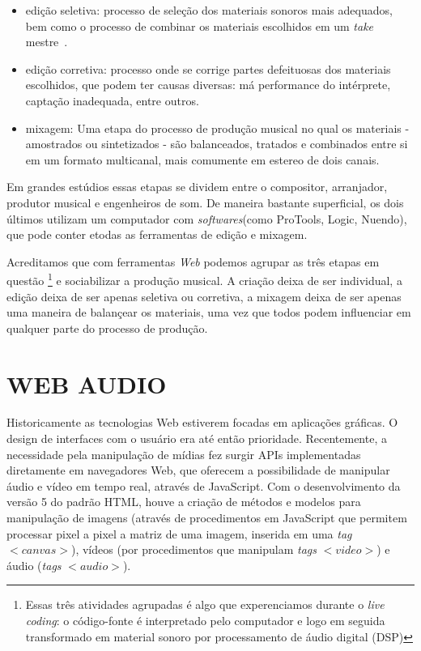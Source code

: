 \documentclass
  [ams,pdfout]%
        {aesbr}
\begin{document}
\begin{itemize}
    \item edição seletiva: processo de seleção dos materiais sonoros
      mais adequados, bem como o processo de combinar os materiais
      escolhidos em um \emph{take} mestre~\cite{izhaki2008mix}.
    \item edição corretiva: processo onde se corrige partes
      defeituosas dos materiais escolhidos, que podem ter causas
      diversas: má performance do intérprete, captação inadequada,
      entre outros.
    \item mixagem: Uma etapa do processo de produção musical no qual
      os materiais - amostrados ou sintetizados - são balanceados,
      tratados e combinados entre si em um formato multicanal, mais
      comumente em estereo de dois canais.
\end{itemize}

Em grandes estúdios essas etapas se dividem entre o compositor,
arranjador, produtor musical e engenheiros de som. De maneira bastante
superficial, os dois últimos utilizam um computador com
\emph{softwares}(como ProTools, Logic, Nuendo), que pode conter etodas
as ferramentas de edição e mixagem.

Acreditamos que com ferramentas \emph{Web} podemos agrupar as três
etapas em questão \footnote{Essas três atividades agrupadas é algo que
  experenciamos durante o \emph{live coding}: o código-fonte é
  interpretado pelo computador e logo em seguida transformado em
  material sonoro por processamento de áudio digital (DSP)} e
sociabilizar a produção musical. A criação deixa de ser individual, a
edição deixa de ser apenas seletiva ou corretiva, a mixagem deixa de
ser apenas uma maneira de balançear os materiais, uma vez que todos
podem influenciar em qualquer parte do processo de produção.

\section{WEB AUDIO}

Historicamente as tecnologias Web estiverem focadas em aplicações
gráficas. O design de interfaces com o usuário era até então
prioridade. Recentemente, a necessidade pela manipulação de mídias fez
surgir APIs implementadas diretamente em navegadores Web, que oferecem
a possibilidade de manipular áudio e vídeo em tempo real, através de
JavaScript. Com o desenvolvimento da versão 5 do padrão HTML, houve a
criação de métodos e modelos para manipulação de imagens (através de
procedimentos em JavaScript que permitem processar pixel a pixel a
matriz de uma imagem, inserida em uma \emph{tag} $<canvas>$), vídeos
(por procedimentos que manipulam \emph{tags} $<video>$) e áudio
(\emph{tags} $<audio>$).
\end{document}
